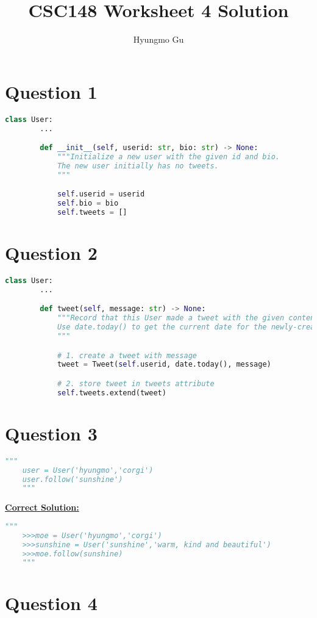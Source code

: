 \documentclass[12pt]{article}
\begin{document}
\title{CSC148 Worksheet 4 Solution}
\author{Hyungmo Gu}
\maketitle

\section*{Question 1}
\begin{lstlisting}[language=Python]
    class User:
        ...

        def __init__(self, userid: str, bio: str) -> None:
            """Initialize a new user with the given id and bio.
            The new user initially has no tweets.
            """

            self.userid = userid
            self.bio = bio
            self.tweets = []

\end{lstlisting}


\section*{Question 2}

\begin{lstlisting}[language=Python]
    class User:
        ...

        def tweet(self, message: str) -> None:
            """Record that this User made a tweet with the given content.
            Use date.today() to get the current date for the newly-created tweet.
            """

            # 1. create a tweet with message
            tweet = Tweet(self.userid, date.today(), message)

            # 2. store tweet in tweets attribute
            self.tweets.extend(tweet)

\end{lstlisting}

\section*{Question 3}

\begin{lstlisting}[language=Python]
    """
    user = User('hyungmo','corgi')
    user.follow('sunshine')
    """
\end{lstlisting}

\bigskip

\begin{mdframed}
    \underline{\textbf{Correct Solution:}}

    \begin{lstlisting}[language=Python]
    """
    >>>moe = User('hyungmo','corgi')
    >>>sunshine = User('sunshine','warm, kind and beautiful')
    >>>moe.follow(sunshine)
    """
    \end{lstlisting}

\end{mdframed}

\section*{Question 4}

\begin{lstlisting}[language=Python]

\end{lstlisting}
\end{document}

